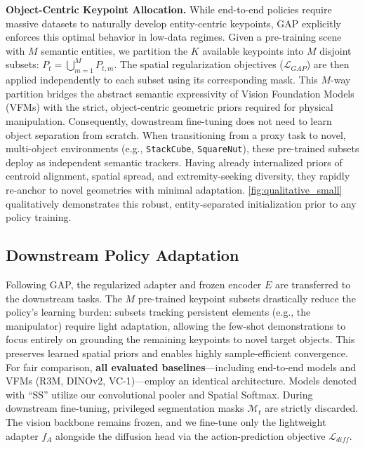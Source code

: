 \indent\textbf{Object-Centric Keypoint Allocation.} While end-to-end policies require massive datasets to naturally develop entity-centric keypoints, GAP explicitly enforces this optimal behavior in low-data regimes. Given a pre-training scene with $M$ semantic entities, we partition the $K$ available keypoints into $M$ disjoint subsets: $P_t = \bigcup_{m=1}^{M} P_{t,m}$. The spatial regularization objectives ($\mathcal{L}_{GAP}$) are then applied independently to each subset using its corresponding mask. 
This $M$-way partition bridges the abstract semantic expressivity of Vision Foundation Models (VFMs) with the strict, object-centric geometric priors required for physical manipulation. Consequently, downstream fine-tuning does not need to learn object separation from scratch. When transitioning from a proxy task to novel, multi-object environments (e.g., \texttt{StackCube}, \texttt{SquareNut}), these pre-trained subsets deploy as independent semantic trackers. Having already internalized priors of centroid alignment, spatial spread, and extremity-seeking diversity, they rapidly re-anchor to novel geometries with minimal adaptation. \autoref{fig:qualitative_small} qualitatively demonstrates this robust, entity-separated initialization prior to any policy training.




\subsection{Downstream Policy Adaptation}
\label{subsec:downstream_adapt}
Following GAP, the regularized adapter and frozen encoder $E$ are transferred to the downstream tasks. The $M$ pre-trained keypoint subsets drastically reduce the policy's learning burden: subsets tracking persistent elements (e.g., the manipulator) require light adaptation, allowing the few-shot demonstrations to focus entirely on grounding the remaining keypoints to novel target objects. This preserves learned spatial priors and enables highly sample-efficient convergence.
For fair comparison, \textbf{all evaluated baselines}---including end-to-end models and VFMs (R3M, DINOv2, VC-1)---employ an identical architecture. Models denoted with ``SS'' utilize our convolutional pooler and Spatial Softmax. During downstream fine-tuning, privileged segmentation masks $\mathcal{M}_t$ are strictly discarded. The vision backbone remains frozen, and we fine-tune only the lightweight adapter $f_A$ alongside the diffusion head via the action-prediction objective $\mathcal{L}_{diff}$.

